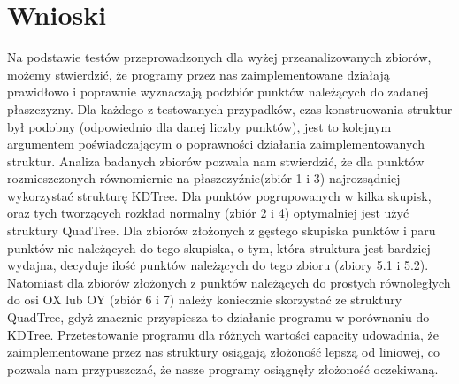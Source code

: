 \documentclass[a4paper, 12pt]{article}
\begin{document}
  \section{Wnioski}
    \quad Na podstawie testów przeprowadzonych dla wyżej przeanalizowanych zbiorów, możemy stwierdzić, że programy przez nas zaimplementowane działają prawidłowo i poprawnie wyznaczają podzbiór punktów należących do zadanej płaszczyzny. Dla każdego z testowanych przypadków, czas konstruowania struktur był podobny (odpowiednio dla danej liczby punktów), jest to kolejnym argumentem poświadczającym o poprawności działania zaimplementowanych  struktur. Analiza badanych zbiorów pozwala nam stwierdzić, że dla punktów rozmieszczonych równomiernie na płaszczyźnie(zbiór 1 i 3) najrozsądniej wykorzystać strukturę KDTree. Dla punktów pogrupowanych w kilka skupisk, oraz tych tworzących rozkład normalny (zbiór 2 i 4) optymalniej jest użyć struktury QuadTree. Dla zbiorów złożonych z gęstego skupiska punktów i paru punktów nie należących do tego skupiska, o tym, która struktura jest bardziej wydajna, decyduje ilość punktów należących do tego zbioru (zbiory 5.1 i 5.2). Natomiast dla zbiorów złożonych z punktów należących do prostych równoległych do osi OX lub OY (zbiór 6 i 7) należy koniecznie skorzystać ze struktury QuadTree, gdyż znacznie przyspiesza to działanie programu w porównaniu do KDTree. Przetestowanie programu dla różnych wartości capacity udowadnia, że zaimplementowane przez nas struktury osiągają złożoność lepszą od liniowej, co pozwala nam przypuszczać, że nasze programy osiągnęły złożoność oczekiwaną. 
\end{document}
